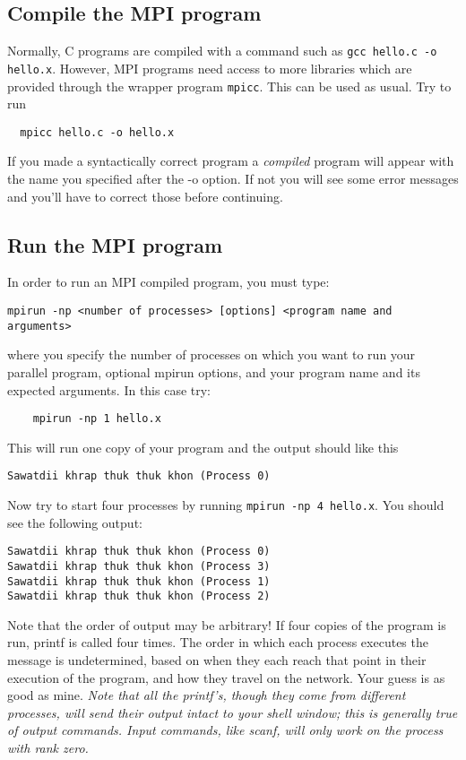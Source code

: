 \documentclass[12pt]{article}
\begin{document}
\subsection*{Compile the MPI program}

Normally, C programs are compiled with a command such as 
\texttt{gcc hello.c -o hello.x}. However, MPI programs need access to 
more libraries which are provided through the wrapper program 
\texttt{mpicc}. This can be used as usual. Try to run
\begin{verbatim} 
  mpicc hello.c -o hello.x
\end{verbatim}
If you made a syntactically correct program a \emph{compiled} 
program will appear with the name you specified after the -o option.
If not you will see some error messages and you'll have to correct 
those before continuing.

\subsection*{Run the MPI program}
In order to run an MPI compiled program, you must type: 
\begin{verbatim}
mpirun -np <number of processes> [options] <program name and arguments>
\end{verbatim} 
where you specify the number of processes on which you want to run 
your parallel program, optional mpirun options, 
and your program name and its expected arguments. 
In this case try:
\begin{verbatim}
    mpirun -np 1 hello.x
\end{verbatim}
This will run one copy of your program and the output should like this
\begin{verbatim} 
Sawatdii khrap thuk thuk khon (Process 0)
\end{verbatim}  

Now try to start four processes by running \texttt{mpirun -np 4 hello.x}.
You should see the following output:
\begin{verbatim}
Sawatdii khrap thuk thuk khon (Process 0)
Sawatdii khrap thuk thuk khon (Process 3)
Sawatdii khrap thuk thuk khon (Process 1)
Sawatdii khrap thuk thuk khon (Process 2)
\end{verbatim}
Note that the order of output may be arbitrary!  If four copies of the
program is run, printf is called four times.  The order in which each
process executes the message is undetermined, based on when they each
reach that point in their execution of the program, and how they
travel on the network. Your guess is as good as mine.  
\emph{Note that all the printf's, though they come from different
  processes, will send their output intact to your shell window; this
  is generally true of output commands. Input commands, like scanf,
  will only work on the process with rank zero.}
\end{document}
